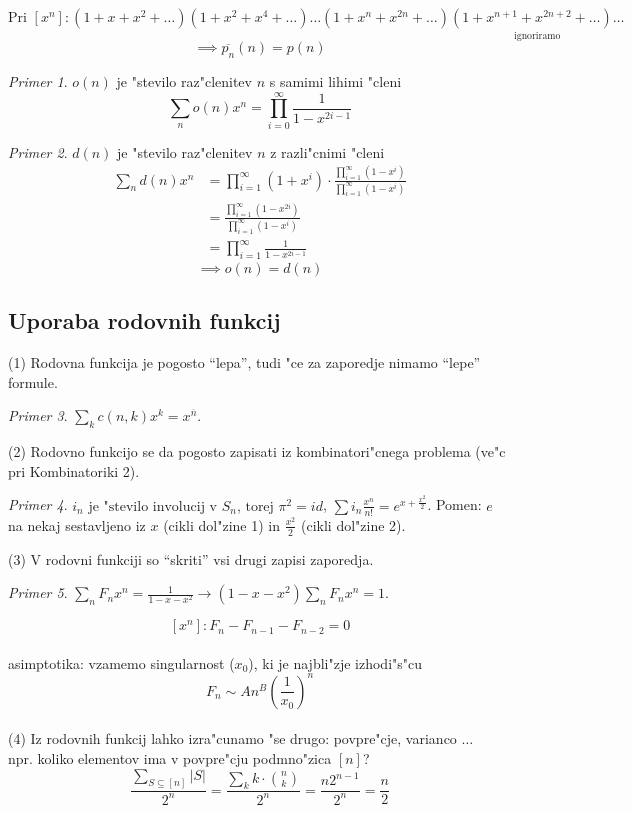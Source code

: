 \documentclass[a4paper,12pt]{article}
\theoremstyle{definition}
\theoremstyle{remark}
\newtheorem*{ex}{Primer}
\begin{document}
\[\text{Pri } [x^n]: (1 + x + x^2 + \ldots) (1 + x^2 + x^4 + \ldots) \ldots (1 + x^n + x^{2n} + \ldots)\underset{\text{ignoriramo}}{(1 + x^{n + 1} + x^{2n + 2} + \ldots) \ldots}\]
\[\implies \overline{p_n}(n) = p(n)\]

\begin{ex}
	$o(n)$ je "stevilo raz"clenitev $n$ s samimi lihimi "cleni
	\[\sum_n o(n) x^n = \prod_{i = 0}^{\infty} \frac{1}{1 - x^{2 i - 1}}\]
\end{ex}
\begin{ex}
	$d(n)$ je "stevilo raz"clenitev $n$ z razli"cnimi "cleni
	\begin{align*}
		\sum_n d(n) x^n &= \prod_{i = 1}^{\infty} (1 + x^i) \cdot \frac{\prod_{i = 1}^{\infty} (1 - x^i)}{\prod_{i = 1}^{\infty} (1 - x^i)}\\
		&= \frac{\prod_{i = 1}^{\infty} (1 - x^{2i})}{\prod_{i = 1}^{\infty} (1 - x^i)}\\
		&= \prod_{i = 1}^{\infty} \frac{1}{1 - x^{2i - 1}}
	\end{align*}
	\[\implies o(n) = d(n)\]
\end{ex}


\label{TODO: to sm malo spustu}
\subsection{Uporaba rodovnih funkcij}

(1) Rodovna funkcija je pogosto ``lepa'', tudi "ce za zaporedje nimamo ``lepe'' formule.
\begin{ex}
	$\sum_k c(n,k)x^k = x^{\overline{n}}$.
\end{ex}
(2) Rodovno funkcijo se da pogosto zapisati iz kombinatori"cnega problema (ve"c pri Kombinatoriki 2).
\begin{ex}
	$i_n \text{ je "stevilo involucij v } S_n \text{, torej } \pi^2 = id$, $\sum i_n \frac{x^n}{n!} = e^{x+\frac{x^2}{2}}$.
	Pomen: $e$ na nekaj sestavljeno iz $x$ (cikli dol"zine 1) in $\frac{x^2}{2}$ (cikli dol"zine 2).
\end{ex}

(3) V rodovni funkciji so ``skriti'' vsi drugi zapisi zaporedja.
\begin{ex}
	$\sum_n F_n x^n = \frac{1}{1-x-x^2} \to (1-x-x^2) \sum_n F_n x^n = 1$.
\end{ex}
\[[x^n]: F_n - F_{n-1} - F_{n-2} = 0 \] \\
asimptotika: vzamemo singularnost ($x_0$), ki je najbli"zje izhodi"s"cu \[F_n \sim An^B(\frac{1}{x_0})^n\] \\
(4) Iz rodovnih funkcij lahko izra"cunamo "se drugo: povpre"cje, varianco $\dots$ \\
npr. koliko elementov ima v povpre"cju podmno"zica $[n]$?
\[\frac{\sum_{S \subseteq [n]} |S|}{2^n} = \frac{\sum_k k \cdot \binom{n}{k}}{2^n} = \frac{n2^{n-1}}{2^n} = \frac{n}{2}\]
\end{document}
